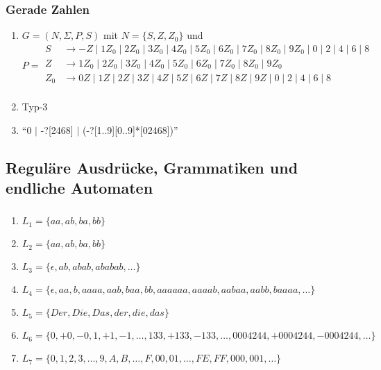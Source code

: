 \documentclass[a4paper, fleqn]{article}
\begin{document}
\subsubsection{Gerade Zahlen}
\begin{enumerate}[label=\alph*)]
    \item $G=(N,\Sigma,P,S)$ mit $N=\{S,Z,Z_0\}$ und
    \[P=
    \begin{split}
        S&\rightarrow -Z\mid 1Z_0\mid 2Z_0\mid 3Z_0\mid 4Z_0\mid 5Z_0\mid 6Z_0\mid 7Z_0\mid 8Z_0\mid 9Z_0\mid 0\mid 2\mid 4\mid 6\mid 8\\
        Z&\rightarrow 1Z_0\mid 2Z_0\mid 3Z_0\mid 4Z_0\mid 5Z_0\mid 6Z_0\mid 7Z_0\mid 8Z_0\mid 9Z_0\\
        Z_0&\rightarrow 0Z\mid 1Z\mid 2Z\mid 3Z\mid 4Z\mid 5Z\mid 6Z\mid 7Z\mid 8Z\mid 9Z\mid 0\mid 2\mid 4\mid 6\mid 8\\
    \end{split}
    \]
    \item Typ-3
    \item ``0 $|$ -?[2468] $|$ (-?[1..9][0..9]*[02468])''
\end{enumerate}
\setcounter{section}{3}
\setcounter{subsection}{0}
\subsection{Reguläre Ausdrücke, Grammatiken und endliche Automaten}
\subsubsection{}
\begin{enumerate}[label=\alph*)]
    \item $L_1=\{aa,ab,ba,bb\}$
    \item $L_2=\{aa,ab,ba,bb\}$
    \item $L_3=\{\epsilon,ab,abab,ababab,\dots\}$
    \item $L_4=\{\epsilon,aa,b,aaaa,aab,baa,bb,aaaaaa,aaaab,aabaa,aabb,baaaa,\dots\}$
    \item $L_5=\{Der, Die, Das, der, die, das\}$
    \item $L_6=\{0, +0, -0, 1, +1, -1,\dots,133,+133,-133,\dots, 0004244,+0004244,-0004244,\dots\}$
    \item $L_7=\{0,1,2,3,\dots,9,A,B,\dots,F,00,01,\dots,FE,FF,000,001,\dots\}$
\end{enumerate}
\end{document}

